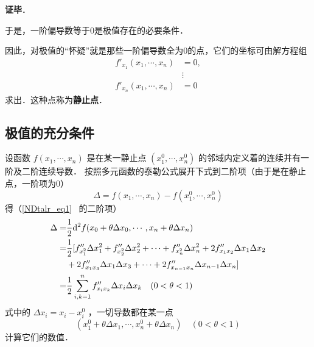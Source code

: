 \textbf{证毕}．

于是，一阶偏导数等于0是极值存在的必要条件．

因此，对极值的“怀疑”就是那些一阶偏导数全为0的点，它们的坐标可由解方程组
\begin{equation}
\begin{aligned}
f'_{x_1}(x_1,\cdots,x_n)&=0,\\
&\vdots\\
f'_{x_n}(x_1,\cdots,x_n)&=0
\end{aligned}
\end{equation}
求出．这种点称为\textbf{静止点}．

\subsection{极值的充分条件}
设函数 $f(x_1,\cdots,x_n)$ 是在某一静止点 $(x_1^0,\cdots,x_n^0)$ 的邻域内定义着的连续并有一阶及二阶连续导数．
按照多元函数的泰勒公式展开下式到二阶项（由于是在静止点，一阶项为0）
\begin{equation}
\Delta=f(x_1,\cdots,x_n)-f(x_1^0,\cdots,x_n^0)
\end{equation}
得（\autoref{NDtalr_eq1}~ 的二阶项）
\begin{equation}
\begin{aligned}
\Delta=&\frac{1}{2}\mathrm{d}^2 f(x_0+\theta\Delta x_0,\cdots,x_n+\theta\Delta x_n)\\
=&\frac{1}{2}[f''_{x_1^2}\Delta x_1^2+f''_{x_2^2}\Delta x_2^2+\cdots+f''_{x_n^2}\Delta x_n^2+2f''_{x_1x_2}\Delta x_1\Delta x_2\\
&+2f''_{x_1x_3}\Delta x_1\Delta x_3+\cdots+2f''_{x_{n-1}x_n}\Delta x_{n-1}\Delta x_n\large]
 \\
 =&\frac{1}{2}\sum_{i,k=1}^nf''_{x_ix_k}\Delta x_i\Delta x_k \quad (0<\theta<1)
\end{aligned}
\end{equation}
式中的 $\Delta x_i=x_i-x_i^0$ ，一切导数都在某一点
\begin{equation}
(x_1^0+\theta\Delta x_1,\cdots,x_n^0+\theta\Delta x_n) \quad (0<\theta<1)
\end{equation}
计算它们的数值．

